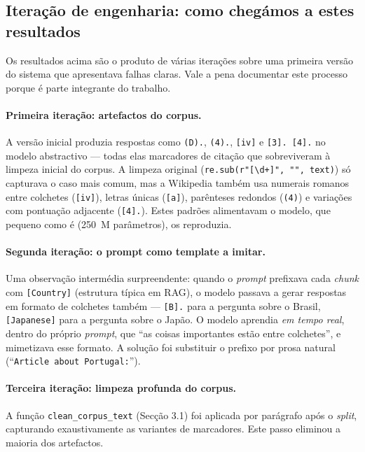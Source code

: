 \documentclass[11pt,a4paper]{article}
\begin{document}
\subsection{Iteração de engenharia: como chegámos a estes resultados}

Os resultados acima são o produto de várias iterações sobre uma primeira versão do sistema que apresentava falhas claras. Vale a pena documentar este processo porque é parte integrante do trabalho.

\paragraph{Primeira iteração: artefactos do corpus.} A versão inicial produzia respostas como \texttt{(D).}, \texttt{(4).}, \texttt{[iv]} e \texttt{[3]. [4].} no modelo abstractivo --- todas elas marcadores de citação que sobreviveram à limpeza inicial do corpus. A limpeza original (\texttt{re.sub(r"[\textbackslash d+]", "", text)}) só capturava o caso mais comum, mas a Wikipedia também usa numerais romanos entre colchetes (\texttt{[iv]}), letras únicas (\texttt{[a]}), parênteses redondos (\texttt{(4)}) e variações com pontuação adjacente (\texttt{[4].}). Estes padrões alimentavam o modelo, que pequeno como é (250~M parâmetros), os reproduzia.

\paragraph{Segunda iteração: o prompt como template a imitar.} Uma observação intermédia surpreendente: quando o \emph{prompt} prefixava cada \emph{chunk} com \texttt{[Country]} (estrutura típica em RAG), o modelo passava a gerar respostas em formato de colchetes também --- \texttt{[B].} para a pergunta sobre o Brasil, \texttt{[Japanese]} para a pergunta sobre o Japão. O modelo aprendia \emph{em tempo real}, dentro do próprio \emph{prompt}, que ``as coisas importantes estão entre colchetes'', e mimetizava esse formato. A solução foi substituir o prefixo por prosa natural (``\texttt{Article about Portugal:}'').

\paragraph{Terceira iteração: limpeza profunda do corpus.} A função \texttt{clean\_corpus\_text} (Secção 3.1) foi aplicada por parágrafo após o \emph{split}, capturando exaustivamente as variantes de marcadores. Este passo eliminou a maioria dos artefactos.
\end{document}
